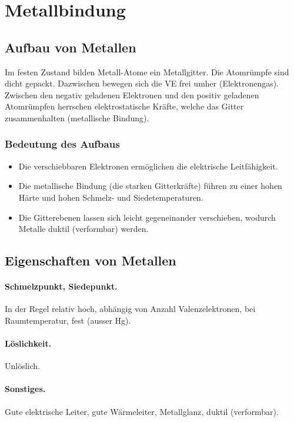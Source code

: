 
\section{Metallbindung}

\subsection{Aufbau von Metallen}

Im festen Zustand bilden Metall-Atome ein Metallgitter. Die Atomrümpfe sind dicht gepackt.
Dazwischen bewegen sich die VE frei umher (Elektronengas). Zwischen den negativ
geladenen Elektronen und den positiv geladenen Atomrümpfen herrschen elektrostatische
Kräfte, welche das Gitter zusammenhalten (metallische Bindung).

\subsubsection{Bedeutung des Aufbaus}
\begin{itemize}
	\item Die verschiebbaren Elektronen ermöglichen die elektrische Leitfähigkeit.
	\item Die metallische Bindung (die starken Gitterkräfte) führen zu einer hohen Härte und
	hohen Schmelz- und Siedetemperaturen.
	\item Die Gitterebenen lassen sich leicht gegeneinander verschieben, wodurch Metalle
	duktil (verformbar) werden.
\end{itemize}

\subsection{Eigenschaften von Metallen}

\paragraph{Schmelzpunkt, Siedepunkt.}

In der Regel relativ hoch, abhängig von Anzahl Valenzelektronen, bei Raumtemperatur, fest (ausser Hg).

\paragraph{Löslichkeit.}

Unlöslich.

\paragraph{Sonstiges.}

Gute elektrische Leiter, gute Wärmeleiter, Metallglanz, duktil (verformbar).